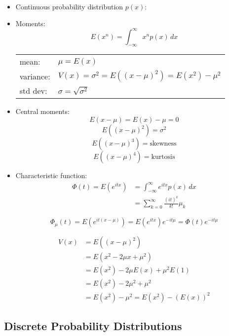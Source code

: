 \begin{itemize}
      \item Continuous probability distribution $p(x)$:
      \item Moments:
            \[ E(x^n) = \int_{-\infty}^{\infty} x^n p(x) \, dx \]

            \begin{tabular}[c]{ll}
                  mean:     & $\mu = E(x)$                                      \\
                  variance: & $V(x) = \sigma^2 = E((x-\mu)^2) = E(x^2) - \mu^2$ \\
                  std dev:  & $\sigma = \sqrt{\sigma^2}$
            \end{tabular}

      \item Central moments:
            \[ E(x-\mu)= E(x) - \mu = 0 \]
            \[ E((x-\mu)^2) = \sigma^2 \]
            \[ E((x-\mu)^3) = \text{skewness} \]
            \[ E((x-\mu)^4) = \text{kurtosis} \]

      \item Characteristic function:
            \begin{align}
                  \Phi(t) = E(e^{itx}) & = \int_{-\infty}^{\infty} e^{itx} p(x) \, dx  \\
                                       & = \sum_{k=0}^{\infty} \frac{(it)^k}{k!} \mu_k
            \end{align}

            \[ \Phi_{\mu}(t) = E(e^{it(x-\mu)}) = E(e^{itx}) e^{-it\mu} = \Phi(t) e^{-it\mu} \]

            \begin{align}
                  V(x) & = E((x-\mu)^2)                       \\
                       & = E(x^2 - 2\mu x + \mu^2)            \\
                       & = E(x^2) - 2\mu E(x) + \mu^2 E(1)    \\
                       & = E(x^2) - 2\mu^2 + \mu^2            \\
                       & = E(x^2) - \mu^2 = E(x^2) - (E(x))^2
            \end{align}
\end{itemize}

\subsection{Discrete Probability Distributions}

